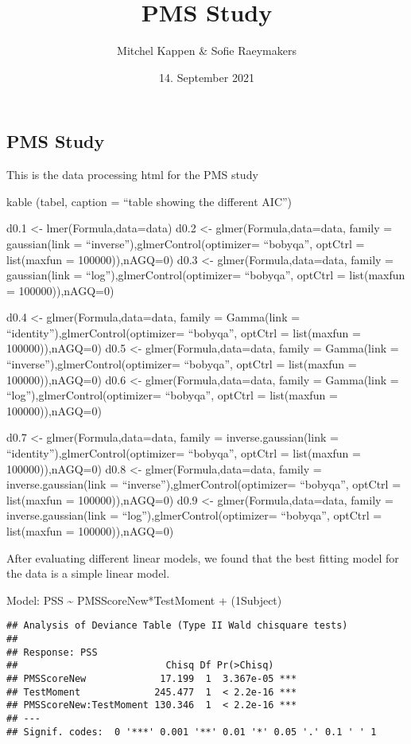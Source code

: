 \documentclass[
]{article}
\title{PMS Study}
\author{Mitchel Kappen \& Sofie Raeymakers}
\date{14. September 2021}
\begin{document}
\maketitle

\hypertarget{pms-study}{%
\subsection{PMS Study}\label{pms-study}}

This is the data processing html for the PMS study

kable (tabel, caption = ``table showing the different AIC'')

d0.1 \textless- lmer(Formula,data=data) d0.2 \textless-
glmer(Formula,data=data, family = gaussian(link =
``inverse''),glmerControl(optimizer= ``bobyqa'', optCtrl = list(maxfun =
100000)),nAGQ=0) d0.3 \textless- glmer(Formula,data=data, family =
gaussian(link = ``log''),glmerControl(optimizer= ``bobyqa'', optCtrl =
list(maxfun = 100000)),nAGQ=0)

d0.4 \textless- glmer(Formula,data=data, family = Gamma(link =
``identity''),glmerControl(optimizer= ``bobyqa'', optCtrl = list(maxfun
= 100000)),nAGQ=0) d0.5 \textless- glmer(Formula,data=data, family =
Gamma(link = ``inverse''),glmerControl(optimizer= ``bobyqa'', optCtrl =
list(maxfun = 100000)),nAGQ=0) d0.6 \textless- glmer(Formula,data=data,
family = Gamma(link = ``log''),glmerControl(optimizer= ``bobyqa'',
optCtrl = list(maxfun = 100000)),nAGQ=0)

d0.7 \textless- glmer(Formula,data=data, family = inverse.gaussian(link
= ``identity''),glmerControl(optimizer= ``bobyqa'', optCtrl =
list(maxfun = 100000)),nAGQ=0) d0.8 \textless- glmer(Formula,data=data,
family = inverse.gaussian(link = ``inverse''),glmerControl(optimizer=
``bobyqa'', optCtrl = list(maxfun = 100000)),nAGQ=0) d0.9 \textless-
glmer(Formula,data=data, family = inverse.gaussian(link =
``log''),glmerControl(optimizer= ``bobyqa'', optCtrl = list(maxfun =
100000)),nAGQ=0)

After evaluating different linear models, we found that the best fitting
model for the data is a simple linear model.

Model: PSS \textasciitilde{} PMSScoreNew*TestMoment +
(1\textbar Subject)

\begin{verbatim}
## Analysis of Deviance Table (Type II Wald chisquare tests)
## 
## Response: PSS
##                          Chisq Df Pr(>Chisq)    
## PMSScoreNew             17.199  1  3.367e-05 ***
## TestMoment             245.477  1  < 2.2e-16 ***
## PMSScoreNew:TestMoment 130.346  1  < 2.2e-16 ***
## ---
## Signif. codes:  0 '***' 0.001 '**' 0.01 '*' 0.05 '.' 0.1 ' ' 1
\end{verbatim}
\end{document}
